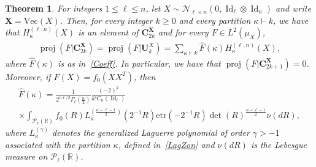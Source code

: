 \documentclass[10pt]{amsart}
\newtheorem{theo}{Theorem}[section]
\theoremstyle{definition}\newtheorem{defi}[theo]{Definition}\newtheorem{rema}[theo]{Remark}\newtheorem{exam}[theo]{Example}\newtheorem{exem}[theo]{Example}\newtheorem{nota}[theo]{Notation}
\DeclareMathOperator{\proj}{proj}
\DeclareMathOperator{\Id}{Id}
\newcommand{\scN}{\mathscr{N}}
\renewcommand{\Vec}{\mathrm{Vec}}
\newcommand{\bfX}{\mathbf{X}}
\newcommand{\bfC}{\mathbf{C}}
\newcommand{\bfU}{\mathbf{U}}
\newcommand{\clP}{\mathcal{P}}
\newcommand{\R}{\mathbb{R}}
\newcommand{\etr}[1]{\mathrm{etr}\left(#1\right)}
\begin{document}
\begin{theo}\label{ThmWC}
For integers $1\leq \ell \leq n$, let $X \sim \scN_{\ell \times n}(0, \Id_{\ell} \otimes \Id_n)$ and write $\bfX=\Vec(X)$. Then, for every integer $k\geq0$ and every partition $\kappa\vdash k$, we have that $H_{\kappa}^{(\ell,n)}(X)$ is an element of $\bfC_{2k}^{\bfX}$ and for every $F \in L^2(\mu_X)$,
\begin{gather}\label{proj2k}
\proj\left(F|\bfC_{2k}^{\bfX}\right) = \proj\left(F|\bfU_k^X\right) =
\sum_{\kappa\vdash k} \widehat{F}(\kappa) H_{\kappa}^{(\ell,n)}(X),
\end{gather}
where $\widehat{F}(\kappa)$ is as in~\eqref{Coeff}. In particular, we have that $\proj(F|\bfC_{2k+1}^{\bfX})=0$. Moreover, if $F(X)=f_0(XX^T)$, then
\begin{multline}\label{RAD}
\widehat{F}(\kappa) = \frac{1}{2^{n\ell/2}\Gamma_{\ell}\left(\frac{n}{2}\right)}\frac{(-2)^{k}}{k!C_{\kappa}(\Id_{\ell})}\\
\times\int_{\clP_{\ell}(\R)} f_0(R) L_{\kappa}^{\left(\frac{n-\ell-1}{2}\right)}(2^{-1}R) \etr{-2^{-1}R} \det(R)^{\frac{n-\ell-1}{2}}\nu(dR),
\end{multline}
where $L_{\kappa}^{(\gamma)}$ denotes the generalized Laguerre polynomial of order $\gamma>-1$ associated with the partition $\kappa$, defined in~\eqref{LagZon} and $\nu(dR)$ is the Lebesgue measure on $\clP_{\ell}(\R)$.
\end{theo}
\end{document}
